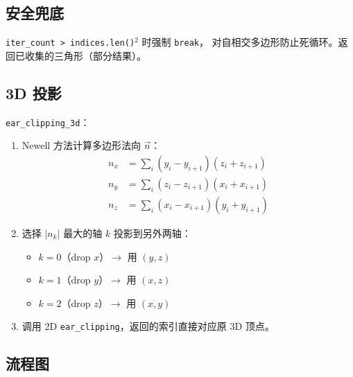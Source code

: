 \documentclass[11pt,a4paper]{article}
\begin{document}
\subsection{安全兜底}

\texttt{iter\_count > indices.len()$^2$} 时强制 \texttt{break}，
对自相交多边形防止死循环。返回已收集的三角形（部分结果）。

\subsection{3D 投影}

\texttt{ear\_clipping\_3d}：
\begin{enumerate}
  \item Newell 方法计算多边形法向 $\vec{n}$：
    \begin{align}
      n_x &= \sum_i (y_i - y_{i+1})(z_i + z_{i+1}) \\
      n_y &= \sum_i (z_i - z_{i+1})(x_i + x_{i+1}) \\
      n_z &= \sum_i (x_i - x_{i+1})(y_i + y_{i+1})
    \end{align}
  \item 选择 $|n_k|$ 最大的轴 $k$ 投影到另外两轴：
    \begin{itemize}
      \item $k = 0$（drop $x$）$\to$ 用 $(y, z)$
      \item $k = 1$（drop $y$）$\to$ 用 $(x, z)$
      \item $k = 2$（drop $z$）$\to$ 用 $(x, y)$
    \end{itemize}
  \item 调用 2D \texttt{ear\_clipping}，返回的索引直接对应原 3D 顶点。
\end{enumerate}

\subsection{流程图}
\end{document}
